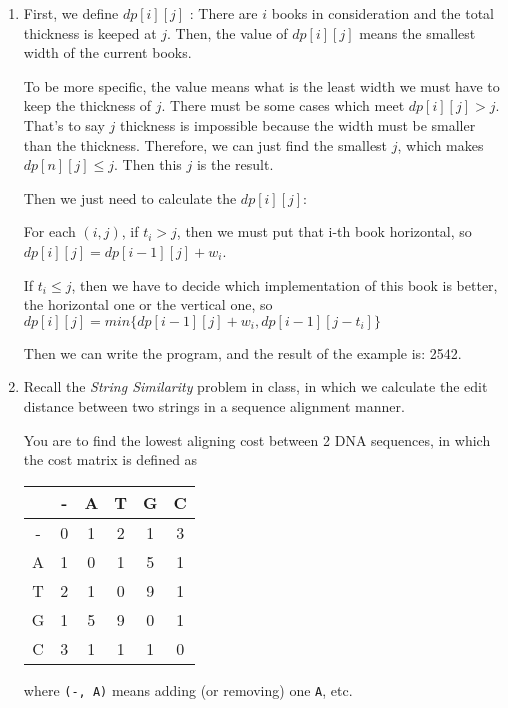 \documentclass[12pt,a4paper]{article}
\makeatletter
\newtheorem*{solution}{Solution}
\theoremstyle{definition}
\renewenvironment{solution}[1][Solution] {\par\pushQED{\qed}\normalfont\topsep6\p@\@plus6\p@\relax\trivlist\item[\hskip\labelsep\bfseries#1\@addpunct{.}]\ignorespaces}{\popQED\endtrivlist\@endpefalse} \makeatother
\makeatother
\begin{document}
\begin{enumerate}
\begin{solution}
	First, we define $dp[i][j]$ : There are $i$ books in consideration and the total thickness is keeped at $j$. Then, the value of $dp[i][j]$ means the smallest width  of the current books.
	
	To be more specific, the value means what is the least width we must have to keep the thickness of $j$. There must be some cases which meet $dp[i][j]>j$. That's to say $j$ thickness is impossible
    because the width must be smaller than the thickness. Therefore, we can just find the smallest $j$, which makes $dp[n][j]\leq j$. Then this $j$ is the result.
   
   Then we just need to calculate the $dp[i][j]$:
   
   For each $(i,j)$, if $t_i>j$, then we must put that i-th book horizontal, so $dp[i][j]=dp[i-1][j]+w_i$.
   
   If $t_i\leq j$, then we have to decide which implementation of this book is better, the horizontal one or the vertical one, so $dp[i][j]=min\{dp[i-1][j]+w_i,dp[i-1][j-t_i]\}$
   
   Then we can write the program, and the result of the example is: 2542.
   
   
    \end{solution}

    \item
    Recall the \emph{String Similarity} problem in class, in which we calculate the edit distance between two strings in a sequence alignment manner.

    You are to find the lowest aligning cost between 2 DNA sequences, in which the cost matrix is defined as

    \begin{center}
        \begin{tabular}{|c||c|c|c|c|c|}
        \hline
          & - & A & T & G & C \\
        \hline
        - & 0 & 1 & 2 & 1 & 3 \\
        A & 1 & 0 & 1 & 5 & 1 \\
        T & 2 & 1 & 0 & 9 & 1 \\
        G & 1 & 5 & 9 & 0 & 1 \\
        C & 3 & 1 & 1 & 1 & 0 \\
        \hline
        \end{tabular}
    \end{center}

    where \texttt{(-, A)} means adding (or removing) one \texttt{A}, etc.


\end{enumerate}
\end{document}
